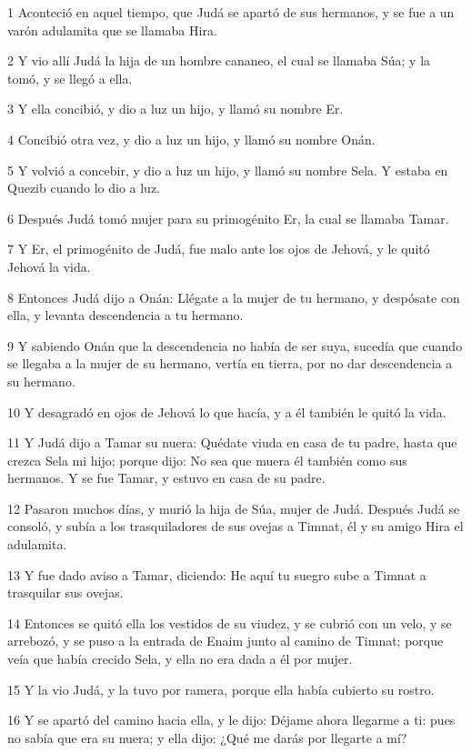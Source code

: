 \par 1 Aconteció en aquel tiempo, que Judá se apartó de sus hermanos, y se fue a un varón adulamita que se llamaba Hira.
\par 2 Y vio allí Judá la hija de un hombre cananeo, el cual se llamaba Súa; y la tomó, y se llegó a ella.
\par 3 Y ella concibió, y dio a luz un hijo, y llamó su nombre Er.
\par 4 Concibió otra vez, y dio a luz un hijo, y llamó su nombre Onán.
\par 5 Y volvió a concebir, y dio a luz un hijo, y llamó su nombre Sela. Y estaba en Quezib cuando lo dio a luz.
\par 6 Después Judá tomó mujer para su primogénito Er, la cual se llamaba Tamar.
\par 7 Y Er, el primogénito de Judá, fue malo ante los ojos de Jehová, y le quitó Jehová la vida.
\par 8 Entonces Judá dijo a Onán: Llégate a la mujer de tu hermano, y despósate con ella, y levanta descendencia a tu hermano.
\par 9 Y sabiendo Onán que la descendencia no había de ser suya, sucedía que cuando se llegaba a la mujer de su hermano, vertía en tierra, por no dar descendencia a su hermano.
\par 10 Y desagradó en ojos de Jehová lo que hacía, y a él también le quitó la vida.
\par 11 Y Judá dijo a Tamar su nuera: Quédate viuda en casa de tu padre, hasta que crezca Sela mi hijo; porque dijo: No sea que muera él también como sus hermanos. Y se fue Tamar, y estuvo en casa de su padre.
\par 12 Pasaron muchos días, y murió la hija de Súa, mujer de Judá. Después Judá se consoló, y subía a los trasquiladores de sus ovejas a Timnat, él y su amigo Hira el adulamita.
\par 13 Y fue dado aviso a Tamar, diciendo: He aquí tu suegro sube a Timnat a trasquilar sus ovejas.
\par 14 Entonces se quitó ella los vestidos de su viudez, y se cubrió con un velo, y se arrebozó, y se puso a la entrada de Enaim junto al camino de Timnat; porque veía que había crecido Sela, y ella no era dada a él por mujer.
\par 15 Y la vio Judá, y la tuvo por ramera, porque ella había cubierto su rostro.
\par 16 Y se apartó del camino hacia ella, y le dijo: Déjame ahora llegarme a ti: pues no sabía que era su nuera; y ella dijo: ¿Qué me darás por llegarte a mí?
